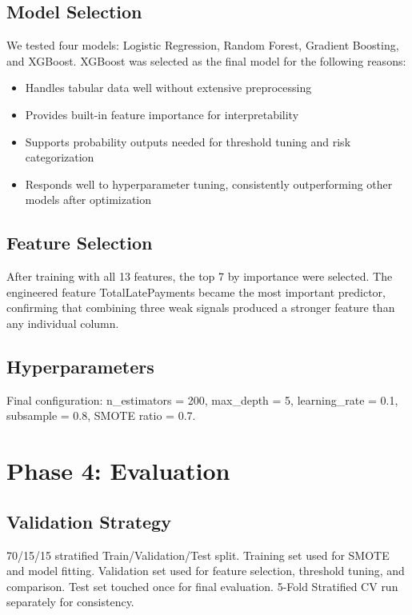 \documentclass[12pt, a4paper]{article}
\begin{document}
\subsection{Model Selection}

We tested four models: Logistic Regression, Random Forest, Gradient Boosting, and XGBoost. XGBoost was selected as the final model for the following reasons:

\begin{itemize}[noitemsep]
    \item Handles tabular data well without extensive preprocessing
    \item Provides built-in feature importance for interpretability
    \item Supports probability outputs needed for threshold tuning and risk categorization
    \item Responds well to hyperparameter tuning, consistently outperforming other models after optimization
\end{itemize}

\subsection{Feature Selection}

After training with all 13 features, the top 7 by importance were selected. The engineered feature TotalLatePayments became the most important predictor, confirming that combining three weak signals produced a stronger feature than any individual column.

\subsection{Hyperparameters}

Final configuration: n\_estimators = 200, max\_depth = 5, learning\_rate = 0.1, subsample = 0.8, SMOTE ratio = 0.7.

\section{Phase 4: Evaluation}

\subsection{Validation Strategy}

70/15/15 stratified Train/Validation/Test split. Training set used for SMOTE and model fitting. Validation set used for feature selection, threshold tuning, and comparison. Test set touched once for final evaluation. 5-Fold Stratified CV run separately for consistency.
\end{document}
